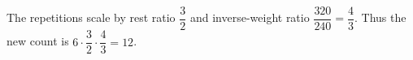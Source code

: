 The repetitions scale by rest ratio $\dfrac{3}{2}$ and inverse-weight ratio $\dfrac{320}{240}=\dfrac{4}{3}$. Thus the new count is $6\cdot\dfrac{3}{2}\cdot\dfrac{4}{3}=\boxed{12}$.
